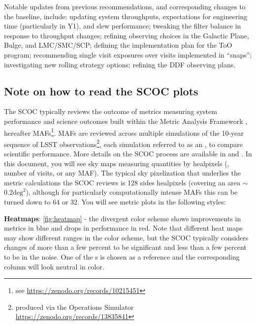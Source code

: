 Notable updates from previous recommendations, and corresponding changes to the baseline, include: updating system throughputs,  expectations for engineering time (particularly in Y1), and slew performance; tweaking the filter balance in response to throughput changes; refining observing choices in the Galactic Plane, Bulge, and LMC/SMC/SCP; defining the implementation plan for the ToO program; recommending single visit exposures over visits implemented in ``snaps''; investigating new rolling strategy options; refining the DDF observing plans.


\subsection{Note on how to read the SCOC plots}

The SCOC typically reviews the outcome of metrics measuring system performance and science outcomes built within the Metric Analysis Framework \citep{2014SPIE.9149E..0BJ}, hereafter MAFs\footnote{see \url{https://zenodo.org/records/10215451}}. MAFs are reviewed across multiple simulations of the 10-year sequence of LSST observations\footnote{produced via the Operations Simulator \url{https://zenodo.org/records/13835841}}, each simulation referred to as an \opsim, to compare scientific performance. More details on the SCOC process are available in  and \citealt{Bianco_2022}. In this document, you will see sky maps measuring quantities by healpixels (\eg, number of visits, or any MAF). The typical sky pixelization that underlies the metric calculations the SCOC reviews is 128 sides healpixels (covering an area \mbox{$\sim$0.2$\mathrm{deg}^2$}), although for particularly computationally intense MAFs this can be turned down to 64 or 32. You will see metric plots in the following styles:



{\bf Heatmaps}: \autoref{fig:heatmap} -
the divergent color scheme shows improvements in metrics in blue and drops in performance in red. Note that different heat maps may show different ranges in the color scheme, but the SCOC typically considers changes of more than a few percent to be significant and less than a few percent to be in the noise. One of the \opsim s is chosen as a reference and the corresponding column will look neutral in color.

